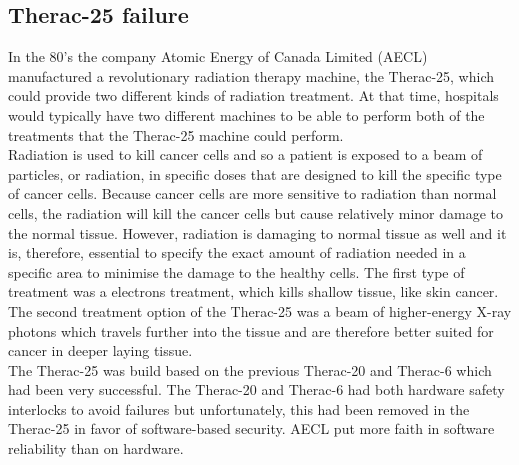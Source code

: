 \subsection{Therac-25 failure}
In the 80's the company Atomic Energy of Canada Limited (AECL) manufactured a revolutionary radiation therapy machine, the Therac-25\cite{Leveson1993}, which could provide two different kinds of radiation treatment. At that time, hospitals would typically have two different machines to be able to perform both of the treatments that the Therac-25 machine could perform.\\
Radiation is used to kill cancer cells and so a patient is exposed to a beam of particles, or radiation, in specific doses that are designed to kill the specific type of cancer cells. Because cancer cells are more sensitive to radiation than normal cells, the radiation will kill the cancer cells but cause relatively minor damage to the normal tissue. However, radiation is damaging to normal tissue as well and it is, therefore, essential to specify the exact amount of radiation needed in a specific area to minimise the damage to the healthy cells.
The first type of treatment was a electrons treatment, which kills shallow tissue, like skin cancer. The second treatment option of the Therac-25 was a beam of higher-energy X-ray photons which travels further into the tissue and are therefore better suited for cancer in deeper laying tissue. \\

The Therac-25 was build based on the previous Therac-20 and Therac-6 which had been very successful. The Therac-20 and Therac-6 had both hardware safety interlocks to avoid failures but unfortunately, this had been removed in the Therac-25 in favor of software-based security. AECL put more faith in software reliability than on hardware. \\

